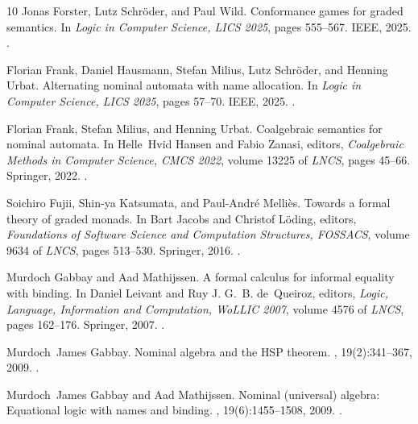 \documentclass[11pt,a4paper]{amsart}
\theoremstyle{plain}
\numberwithin{equation}{section}
\newcommand{\+}[1]{\mathcal{#1}\xspace}
\theoremstyle{definition}
\begin{document}
\begin{thebibliography}{10}
Jonas Forster, Lutz Schröder, and Paul Wild.
\newblock Conformance games for graded semantics.
\newblock In {\em Logic in Computer Science, LICS 2025}, pages 555--567. IEEE,
  2025.
\newblock \href {https://doi.org/10.1109/LICS65433.2025.00048}
  {}.

Florian Frank, Daniel Hausmann, Stefan Milius, Lutz Schröder, and Henning
  Urbat.
\newblock Alternating nominal automata with name allocation.
\newblock In {\em Logic in Computer Science, LICS 2025}, pages 57--70. IEEE,
  2025.
\newblock \href {https://doi.org/10.1109/LICS65433.2025.00012}
  {}.

Florian Frank, Stefan Milius, and Henning Urbat.
\newblock Coalgebraic semantics for nominal automata.
\newblock In Helle~Hvid Hansen and Fabio Zanasi, editors, {\em Coalgebraic
  Methods in Computer Science, {CMCS} 2022}, volume 13225 of {\em LNCS}, pages
  45--66. Springer, 2022.
\newblock \href {https://doi.org/10.1007/978-3-031-10736-8\_3}
  {}.

Soichiro Fujii, Shin{-}ya Katsumata, and Paul{-}Andr{\'{e}} Melli{\`{e}}s.
\newblock Towards a formal theory of graded monads.
\newblock In Bart Jacobs and Christof L{\"{o}}ding, editors, {\em Foundations
  of Software Science and Computation Structures, {FOSSACS}}, volume 9634 of
  {\em LNCS}, pages 513--530. Springer, 2016.
\newblock \href {https://doi.org/10.1007/978-3-662-49630-5\_30}
  {}.

Murdoch Gabbay and Aad Mathijssen.
\newblock A formal calculus for informal equality with binding.
\newblock In Daniel Leivant and Ruy J. G.~B. de~Queiroz, editors, {\em Logic,
  Language, Information and Computation, WoLLIC 2007}, volume 4576 of {\em
  LNCS}, pages 162--176. Springer, 2007.
\newblock \href {https://doi.org/10.1007/978-3-540-73445-1\_12}
  {}.

Murdoch~James Gabbay.
\newblock Nominal algebra and the {HSP} theorem.
, 19(2):341--367, 2009.
\newblock \href {https://doi.org/10.1093/LOGCOM/EXN055}
  {}.

Murdoch~James Gabbay and Aad Mathijssen.
\newblock Nominal (universal) algebra: Equational logic with names and binding.
, 19(6):1455--1508, 2009.
\newblock \href {https://doi.org/10.1093/LOGCOM/EXP033}
  {}.


\end{thebibliography}
\end{document}
